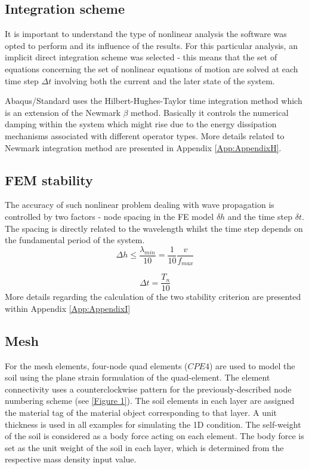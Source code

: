 \documentclass[10pt,a4paper]{report}
\begin{document}
\subsection{Integration scheme}
It is important to understand the type of nonlinear analysis the software was opted to perform and its influence of the results. For this particular analysis, an implicit direct integration scheme was selected - this means that the set of equations concerning the set of nonlinear equations of motion are solved at each time step $\Delta t$ involving both the current and the later state of the system.

Abaqus/Standard uses the Hilbert-Hughes-Taylor time integration method which is an extension of the Newmark $\beta$ method. Basically it controls the numerical damping within the system which might rise due to the energy dissipation mechanisms associated with different operator types. More details related to Newmark integration method are presented in Appendix \ref{App:AppendixH}.

\subsection{FEM stability}
The accuracy of such nonlinear problem dealing with wave propagation is controlled by two factors - node spacing in the FE model $\delta h$ and the time step $\delta t$. The spacing is directly related to the wavelength whilst the time step depends on the fundamental period of the system. 
\begin{equation}
	\Delta h\leq\frac{\lambda_{min}}{10}=\frac{1}{10} \frac{v}{f_{max}}
\end{equation}

\begin{equation}
	\Delta t=\frac{T_n}{10}
\end{equation}
More details regarding the calculation of the two stability criterion are presented within Appendix \ref{App:AppendixI}

\subsection{Mesh}
For the mesh elements, four-node quad elements ($CPE4$) are used to model the soil using the plane strain formulation of the quad-element. The element connectivity uses a counterclockwise pattern for the previously-described node numbering scheme (see \ref{Figure 1}). The soil elements in each layer are assigned the material tag of the material object corresponding to that layer. A unit thickness is used in all examples for simulating the 1D condition. The self-weight of the soil is considered as a body force acting on each element. The body force is set as the unit weight of the soil in each layer, which is determined from the respective mass density input value.
\end{document}
